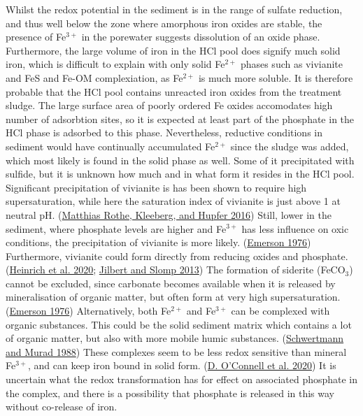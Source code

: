 \documentclass[a4paper,11pt]{article}
\begin{document}
Whilst the redox potential in the sediment is in the range of sulfate reduction, and thus well below the zone where amorphous iron oxides are stable, the presence of Fe\(^{3+}\) in the porewater suggests dissolution of an oxide phase. Furthermore, the large volume of iron in the HCl pool does signify much solid iron, which is difficult to explain with only solid Fe\(^{2+}\) phases such as vivianite and FeS and Fe-OM complexiation, as Fe\(^{2+}\) is much more soluble. It is therefore probable that the HCl pool contains unreacted iron oxides from the treatment sludge. The large surface area of poorly ordered Fe oxides accomodates high number of adsorbtion sites, so it is expected at least part of the phosphate in the HCl phase is adsorbed to this phase.
Nevertheless, reductive conditions in sediment would have continually accumulated Fe\(^{2+}\) since the sludge was added, which most likely is found in the solid phase as well. Some of it precipitated with sulfide, but it is unknown how much and in what form it resides in the HCl pool. Significant precipitation of vivianite is has been shown to require high supersaturation, while here the saturation index of vivianite is just above 1 at neutral pH. (\protect\hyperlink{ref-rotheOccurrenceIdentificationEnvironmental2016}{Matthias Rothe, Kleeberg, and Hupfer 2016}) Still, lower in the sediment, where phosphate levels are higher and Fe\(^{3+}\) has less influence on oxic conditions, the precipitation of vivianite is more likely. (\protect\hyperlink{ref-emersonEarlyDiagenesisAnaerobic1976}{Emerson 1976}) Furthermore, vivianite could form directly from reducing oxides and phosphate. (\protect\hyperlink{ref-heinrichTransformationRedoxsensitiveRedoxstable2020}{Heinrich et al. 2020}; \protect\hyperlink{ref-jilbertIronManganeseShuttles2013}{Jilbert and Slomp 2013}) The formation of siderite (FeCO\(_3\)) cannot be excluded, since carbonate becomes available when it is released by mineralisation of organic matter, but often form at very high supersaturation. (\protect\hyperlink{ref-emersonEarlyDiagenesisAnaerobic1976}{Emerson 1976})
Alternatively, both Fe\(^{2+}\) and Fe\(^{3+}\) can be complexed with organic substances. This could be the solid sediment matrix which contains a lot of organic matter, but also with more mobile humic substances. (\protect\hyperlink{ref-schwertmannNatureIronOxide1988}{Schwertmann and Murad 1988}) These complexes seem to be less redox sensitive than mineral Fe\(^{3+}\), and can keep iron bound in solid form. (\protect\hyperlink{ref-oconnellChangesSedimentaryPhosphorus2020}{D. O'Connell et al. 2020}) It is uncertain what the redox transformation has for effect on associated phosphate in the complex, and there is a possibility that phosphate is released in this way without co-release of iron.
\end{document}
